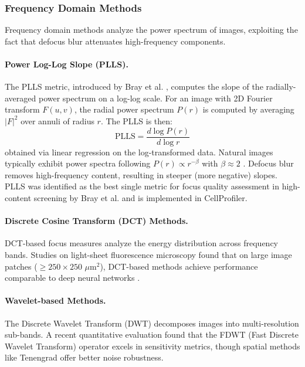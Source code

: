 \subsubsection{Frequency Domain Methods}

Frequency domain methods analyze the power spectrum of images, exploiting the fact that defocus blur attenuates high-frequency components.

\paragraph{Power Log-Log Slope (PLLS).}
The PLLS metric, introduced by Bray et al. \cite{bray2012workflow}, computes the slope of the radially-averaged power spectrum on a log-log scale. For an image with 2D Fourier transform $F(u,v)$, the radial power spectrum $P(r)$ is computed by averaging $|F|^2$ over annuli of radius $r$. The PLLS is then:
\begin{equation}
    \text{PLLS} = \frac{d \log P(r)}{d \log r}
\end{equation}
obtained via linear regression on the log-transformed data. Natural images typically exhibit power spectra following $P(r) \propto r^{-\beta}$ with $\beta \approx 2$ \cite{field1987relations}. Defocus blur removes high-frequency content, resulting in steeper (more negative) slopes. PLLS was identified as the best single metric for focus quality assessment in high-content screening by Bray et al. \cite{bray2012workflow} and is implemented in CellProfiler.

\paragraph{Discrete Cosine Transform (DCT) Methods.}
DCT-based focus measures analyze the energy distribution across frequency bands. Studies on light-sheet fluorescence microscopy found that on large image patches ($\geq 250 \times 250$ $\mu$m$^2$), DCT-based methods achieve performance comparable to deep neural networks \cite{zhang2021deep}.

\paragraph{Wavelet-based Methods.}
The Discrete Wavelet Transform (DWT) decomposes images into multi-resolution sub-bands. A recent quantitative evaluation \cite{sensors2025focus} found that the FDWT (Fast Discrete Wavelet Transform) operator excels in sensitivity metrics, though spatial methods like Tenengrad offer better noise robustness.

